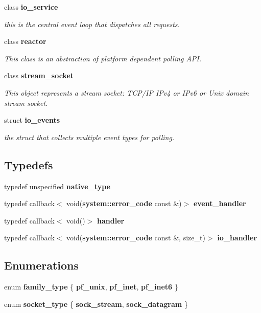 \begin{DoxyCompactItemize}
class {\bf io\-\_\-service}
\begin{DoxyCompactList}\small\item\em this is the central event loop that dispatches all requests. \end{DoxyCompactList}\item 
class {\bf reactor}
\begin{DoxyCompactList}\small\item\em \-This class is an abstraction of platform dependent polling \-A\-P\-I. \end{DoxyCompactList}\item 
class {\bf stream\-\_\-socket}
\begin{DoxyCompactList}\small\item\em \-This object represents a stream socket\-: \-T\-C\-P/\-I\-P \-I\-Pv4 or \-I\-Pv6 or \-Unix domain stream socket. \end{DoxyCompactList}\item 
struct {\bf io\-\_\-events}
\begin{DoxyCompactList}\small\item\em the struct that collects multiple event types for polling. \end{DoxyCompactList}\end{DoxyCompactItemize}
\subsection*{\-Typedefs}
\begin{DoxyCompactItemize}
\item 
typedef unspecified {\bf native\-\_\-type}
\item 
typedef callback$<$ void({\bf system\-::error\-\_\-code} \*
const \&)$>$ {\bf event\-\_\-handler}
\item 
typedef callback$<$ void()$>$ {\bf handler}
\item 
typedef callback$<$ void({\bf system\-::error\-\_\-code} \*
const \&, size\-\_\-t)$>$ {\bf io\-\_\-handler}
\end{DoxyCompactItemize}
\subsection*{\-Enumerations}
\begin{DoxyCompactItemize}
\item 
enum {\bf family\-\_\-type} \{ {\bfseries pf\-\_\-unix}, 
{\bfseries pf\-\_\-inet}, 
{\bfseries pf\-\_\-inet6}
 \}
\item 
enum {\bf socket\-\_\-type} \{ {\bfseries sock\-\_\-stream}, 
{\bfseries sock\-\_\-datagram}
 \}
\end{DoxyCompactItemize}
